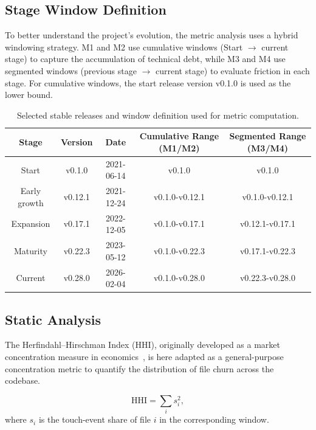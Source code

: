 \documentclass[11pt, a4paper]{article}
\begin{document}
\subsection{Stage Window Definition}

To better understand the project's evolution, the metric analysis uses a hybrid windowing strategy. M1 and M2 use cumulative windows (Start $\rightarrow$ current stage) to capture the accumulation of technical debt, while M3 and M4 use segmented windows (previous stage $\rightarrow$ current stage) to evaluate friction in each stage. For cumulative windows, the start release version v0.1.0 is used as the lower bound.

\begin{table}[H]
\centering
\small
\begin{tabularx}{\textwidth}{|C|C|C|C|C|}
    \hline
    \textbf{Stage} & \textbf{Version} & \textbf{Date} & \textbf{Cumulative Range (M1/M2)} & \textbf{Segmented Range (M3/M4)} \\
    \hline
    Start & v0.1.0 & 2021-06-14 & v0.1.0 & v0.1.0 \\
    \hline
    Early growth & v0.12.1 & 2021-12-24 & v0.1.0-v0.12.1 & v0.1.0-v0.12.1 \\
    \hline
    Expansion & v0.17.1 & 2022-12-05 & v0.1.0-v0.17.1 & v0.12.1-v0.17.1 \\
    \hline
    Maturity & v0.22.3 & 2023-05-12 & v0.1.0-v0.22.3 & v0.17.1-v0.22.3 \\
    \hline
    Current & v0.28.0 & 2026-02-04 & v0.1.0-v0.28.0 & v0.22.3-v0.28.0 \\
    \hline
\end{tabularx}
\caption{Selected stable releases and window definition used for metric computation.}
\label{tab:window_definition}
\end{table}


\subsection{Static Analysis}

The Herfindahl--Hirschman Index (HHI), originally developed as a market concentration measure in economics~\cite{tung_truong_integrated_2021}, is here adapted as a general-purpose concentration metric to quantify the distribution of file churn across the codebase.

\[
\text{HHI} = \sum_i s_i^2,
\]
where $s_i$ is the touch-event share of file $i$ in the corresponding window.
\end{document}
